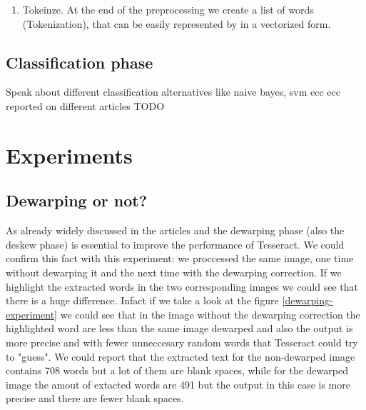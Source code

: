 \documentclass[10pt,twocolumn,letterpaper]{article}
\begin{document}
\begin{enumerate}
    they can be analysed as a single item, identified by the word's
    lemma, or dictionary form.\footnote{Source Wikipedia:
      \href{https://en.wikipedia.org/wiki/Lemmatisation}{
        https://en.wikipedia.org/wiki/Lemmatisation}}. With
    this step, indeed, we tried to group words together in order to
    simplify the classification phase. However, we noticed that this
    step do not improve the performance and it can also produce worst
    results as it tries to group wrong words retrieved from the OCR.
  \item Tokeinze. At the end of the preprocessing we create a list of
    words (Tokenization), that can be easily represented by in a
    vectorized form.
\end{enumerate}

\subsection{Classification phase}
Speak about different classification alternatives like naive bayes, svm ecc ecc reported on different  articles TODO


\section{Experiments}
\label{sec:experiments}

\subsection{Dewarping or not?}
As already widely discussed in the articles \cite{Improvingcamera-based} and \cite{recoveringhomography} the dewarping phase (also the deskew phase) is essential to improve the performance of Tesseract. We could confirm this fact with this experiment: we proccessed the same image, one time without dewarping it and the next time with the dewarping correction. If we highlight the extracted words in the two corresponding images we could see that there is a huge difference. Infact if we take a look at the figure \ref{dewarping-experiment} we could see that in the image without the dewarping correction the highlighted word are less than the same image dewarped and also the output is more precise and with fewer unneccesary random words that Tesseract could try to "guess". We could report that the extracted text for the non-dewarped image contains 708 words but a lot of them are blank spaces, while for the dewarped image the amout of extacted words are 491 but the output in this case is more precise and there are fewer blank spaces.
\end{document}
